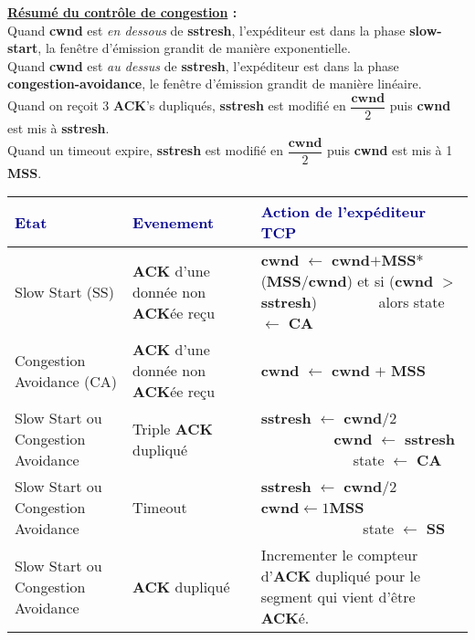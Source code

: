\documentclass{article}
\newcommand{\dblu}[1]{\textcolor{darkblue}{\textbf{#1}}}
\begin{document}
\noindent\textbf{\underline{Résumé du contrôle de congestion} : } \\

\noindent Quand \textbf{cwnd} est \textit{en dessous} de \textbf{sstresh}, l'expéditeur est dans la phase 
\textbf{slow-start}, la fenêtre d'émission grandit de manière exponentielle. \\
Quand \textbf{cwnd} est \textit{au dessus} de \textbf{sstresh}, l'expéditeur est dans la phase 
\textbf{congestion-avoidance}, le fenêtre d'émission grandit de manière linéaire. \\
Quand on reçoit 3 \textbf{ACK}'s dupliqués, \textbf{sstresh} est modifié en $\dfrac{\mathbf{cwnd}}{2}$ puis 
\textbf{cwnd} est mis à \textbf{sstresh}. \\
Quand un timeout expire, \textbf{sstresh} est modifié en $\dfrac{\mathbf{cwnd}}{2}$ puis \textbf{cwnd} est mis à 
1 \textbf{MSS}. \\

\begin{center}
	\begin{tabular}{|p{110px}|p{120px}|p{170px}|}
	\hline
	\dblu{Etat} & \dblu{Evenement} & \dblu{Action de l'expéditeur TCP} \\
	\hline
	Slow Start (SS) & \textbf{ACK} d'une donnée non \textbf{ACK}ée reçu & 
	\textbf{cwnd} $\leftarrow$ \textbf{cwnd}$+$\textbf{MSS}$*$(\textbf{MSS}$/$\textbf{cwnd}) et si (\textbf{cwnd} 
	$>$ \textbf{sstresh}) $\ \ \ \ \ \ \ \ \ \ \ \ \ \ \ \ $
	alors state $\leftarrow$ \textbf{CA}\\
	\hline
	Congestion Avoidance (CA) & \textbf{ACK} d'une donnée non \textbf{ACK}ée reçu & \textbf{cwnd} $\leftarrow$ 
	\textbf{cwnd} $+$ \textbf{MSS}\\
	\hline
	Slow Start ou Congestion Avoidance & Triple \textbf{ACK} dupliqué & \textbf{sstresh} $\leftarrow$ 
	\textbf{cwnd}/2 $\ \ \ \ \ \ \ \ \ \ \ \ \ \ \ \ \ \ \ \ \ $ \textbf{cwnd} $\leftarrow$ \textbf{sstresh} $\ \ 
	\ \ \ \ \ \ \ \ \ \ \ \ \ \ \ \ \ \ \ \ \ \ \ \ \ $ state $\leftarrow$ \textbf{CA} \\
	\hline
	Slow Start ou Congestion Avoidance & Timeout & \textbf{sstresh} $\leftarrow$ \textbf{cwnd}/2 $\ \ \ \ \ \ \ \ 
	\ \ \ \ \ \ \ \ \ \ $ \textbf{cwnd}$\leftarrow 1$\textbf{MSS} $\ \ \ \ \ \ \ \ \ \ \ \ \ \ \ \ \ \ \ \ \ \ \ 
	\ \ \ \ \ \ \ $ state $\leftarrow$ \textbf{SS} 
	\\
	\hline
	Slow Start ou Congestion Avoidance & \textbf{ACK} dupliqué & Incrementer le compteur d'\textbf{ACK} dupliqué 
	pour le segment qui vient d'être \textbf{ACK}é. \\
	\hline
	\end{tabular}
\end{center}
\end{document}
